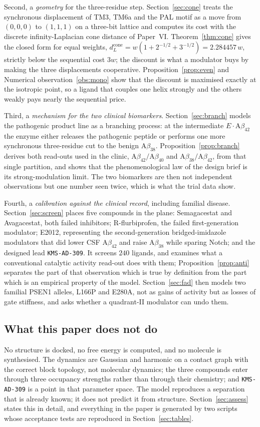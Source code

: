 \documentclass[11pt,reqno]{amsart}
\theoremstyle{plain}
\theoremstyle{definition}
\theoremstyle{remark}
\numberwithin{equation}{section}
\newcommand{\dcone}{d_L^{\mathrm{cone}}}
\newcommand{\Ab}{\mathrm{A}\beta}
\newcommand{\lead}{\texttt{KMS-AD-309}}
\begin{document}
Second, a \emph{geometry} for the three-residue step. Section~\ref{sec:cone} treats the synchronous displacement of TM3, TM6a and the PAL motif as a move from $(0,0,0)$ to $(1,1,1)$ on a three-bit lattice and computes its cost with the discrete infinity-Laplacian cone distance of Paper~VI. Theorem~\ref{thm:cone} gives the closed form for equal weights, $\dcone=w(1+2^{-1/2}+3^{-1/2})=2.284457\,w$, strictly below the sequential cost $3w$; the discount is what a modulator buys by making the three displacements cooperative. Proposition~\ref{prop:even} and Numerical observation~\ref{obs:mono} show that the discount is maximised exactly at the isotropic point, so a ligand that couples one helix strongly and the others weakly pays nearly the sequential price.

Third, a \emph{mechanism for the two clinical biomarkers}. Section~\ref{sec:branch} models the pathogenic product line as a branching process: at the intermediate $E\cdot\Ab_{42}$ the enzyme either releases the pathogenic peptide or performs one more synchronous three-residue cut to the benign $\Ab_{38}$. Proposition~\ref{prop:branch} derives both read-outs used in the clinic, $\Ab_{42}/\Ab_{40}$ and $\Ab_{38}/\Ab_{42}$, from that single partition, and shows that the phenomenological law of the design brief is its strong-modulation limit. The two biomarkers are then not independent observations but one number seen twice, which is what the trial data show.

Fourth, a \emph{calibration against the clinical record}, including familial disease. Section~\ref{sec:screen} places five compounds in the plane: Semagacestat and Avagacestat, both failed inhibitors; R-flurbiprofen, the failed first-generation modulator; E2012, representing the second-generation bridged-imidazole modulators that did lower CSF $\Ab_{42}$ and raise $\Ab_{38}$ while sparing Notch; and the designed lead \lead{}. It screens $240$ ligands, and examines what a conventional catalytic activity read-out does with them; Proposition~\ref{prop:anti} separates the part of that observation which is true by definition from the part which is an empirical property of the model. Section~\ref{sec:fad} then models two familial PSEN1 alleles, L166P and E280A, not as gains of activity but as losses of gate stiffness, and asks whether a quadrant-II modulator can undo them.

\subsection{What this paper does not do}
No structure is docked, no free energy is computed, and no molecule is synthesised. The dynamics are Gaussian and harmonic on a contact graph with the correct block topology, not molecular dynamics; the three compounds enter through three occupancy strengths rather than through their chemistry; and \lead{} is a point in that parameter space. The model reproduces a separation that is already known; it does not predict it from structure. Section~\ref{sec:assess} states this in detail, and everything in the paper is generated by two scripts whose acceptance tests are reproduced in Section~\ref{sec:tables}.
\end{document}
